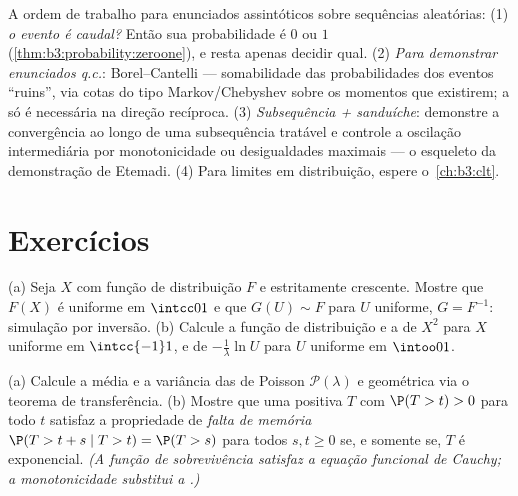 \begin{method}\label{met:b3:probability:toolkit}
A ordem de trabalho para enunciados assintóticos sobre sequências
aleatórias: (1) \emph{o evento é caudal?} Então sua probabilidade é
$0$ ou $1$ (\cref{thm:b3:probability:zeroone}), e resta apenas decidir qual. (2)
\emph{Para demonstrar enunciados q.c.}: Borel--Cantelli --- somabilidade
das probabilidades dos eventos ``ruins'', via cotas do tipo
Markov/Chebyshev sobre os momentos que existirem; a  só é
necessária na direção recíproca. (3) \emph{Subsequência + sanduíche}:
demonstre a convergência ao longo de uma subsequência tratável e
controle a oscilação intermediária por monotonicidade ou desigualdades
maximais --- o esqueleto da demonstração de Etemadi. (4) Para limites em
distribuição, espere o~\cref{ch:b3:clt}.
\end{method}

\section{Exercícios}

\begin{exercise}[$\star$]\label{exo:b3:probability:1}
(a) Seja $X$ com função de distribuição $F$  e
estritamente crescente. Mostre que $F(X)$ é uniforme em $\intcc01$ e que
$G(U) \sim F$ para $U$ uniforme, $G = F^{-1}$: simulação por inversão.
(b) Calcule a função de distribuição e a  de $X^2$ para
$X$ uniforme em $\intcc{-1}1$, e de $-\frac1\lambda\ln
U$ para $U$ uniforme em $\intoo01$.
\end{exercise}

\begin{exercise}[$\star$]\label{exo:b3:probability:2}
(a) Calcule a média e a variância das  de Poisson $\mathcal
P(\lambda)$ e geométrica
via o teorema de transferência.
(b) Mostre que uma  positiva $T$ com $\P(T > t)
> 0$ para
todo $t$ satisfaz a propriedade de \emph{falta de memória} $\P(T > t + s \mid
T > t) = \P(T > s)$
para todos $s, t \geq 0$ se, e somente se, $T$ é exponencial. \emph{(A função
de sobrevivência satisfaz a equação funcional de Cauchy; a
monotonicidade substitui a .)}
\end{exercise}


